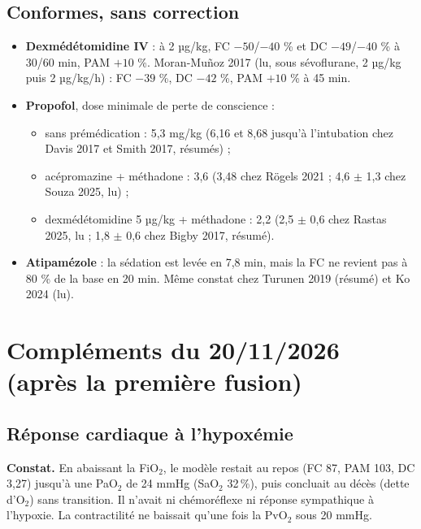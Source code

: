 \documentclass[10pt,a4paper]{article}
\begin{document}
\subsection{Conformes, sans correction}
\begin{itemize}
\item \textbf{Dexmédétomidine IV} : à 2 µg/kg, FC $-50$/$-40$ \% et DC $-49$/$-40$ \% à 30/60 min, PAM $+10$ \%. Moran-Muñoz 2017 (lu, sous sévoflurane, 2 µg/kg puis 2 µg/kg/h) : FC $-39$ \%, DC $-42$ \%, PAM $+10$ \% à 45 min.
\item \textbf{Propofol}, dose minimale de perte de conscience :
  \begin{itemize}
  \item sans prémédication : 5,3 mg/kg (6,16 et 8,68 jusqu'à l'intubation chez Davis 2017 et Smith 2017, résumés) ;
  \item acépromazine + méthadone : 3,6 (3,48 chez Rögels 2021 ; 4,6 $\pm$ 1,3 chez Souza 2025, lu) ;
  \item dexmédétomidine 5 µg/kg + méthadone : 2,2 (2,5 $\pm$ 0,6 chez Rastas 2025, lu ; 1,8 $\pm$ 0,6 chez Bigby 2017, résumé).
  \end{itemize}
\item \textbf{Atipamézole} : la sédation est levée en 7,8 min, mais la FC ne revient pas à 80 \% de la base en 20 min. Même constat chez Turunen 2019 (résumé) et Ko 2024 (lu).
\end{itemize}

\section{Compléments du 20/11/2026 (après la première fusion)}
\subsection{Réponse cardiaque à l'hypoxémie}
\textbf{Constat.} En abaissant la FiO$_2$, le modèle restait au repos (FC 87, PAM 103, DC 3,27) jusqu'à une PaO$_2$ de 24 mmHg (SaO$_2$ 32\,\%), puis concluait au décès (dette d'O$_2$) sans transition. Il n'avait ni chémoréflexe ni réponse sympathique à l'hypoxie. La contractilité ne baissait qu'une fois la PvO$_2$ sous 20 mmHg.
\end{document}
